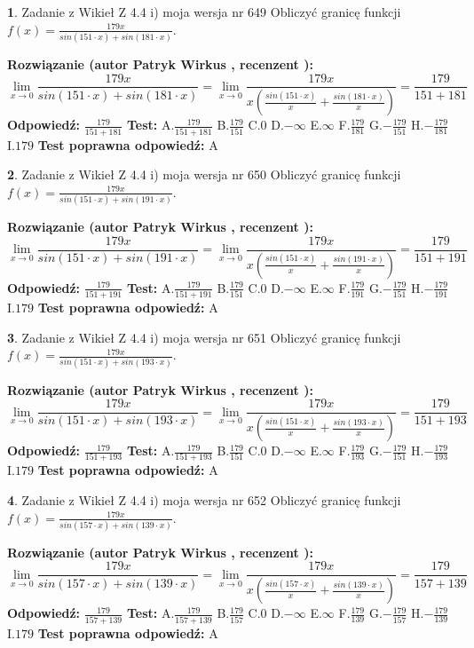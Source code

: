 \documentclass[12pt, a4paper]{article}
\theoremstyle{definition} %
\newtheorem{zad}{}
\newcommand{\zadStart}[1]{\begin{zad}#1\newline}
\newcommand{\zadStop}{\end{zad}}
\newcommand{\rozwStart}[2]{\noindent \textbf{Rozwiązanie (autor #1 , recenzent #2): }\newline}
\newcommand{\rozwStop}{\newline}
\newcommand{\odpStart}{\noindent \textbf{Odpowiedź:}\newline}
\newcommand{\odpStop}{\newline}
\newcommand{\testStart}{\noindent \textbf{Test:}\newline}
\newcommand{\testStop}{\newline}
\newcommand{\kluczStart}{\noindent \textbf{Test poprawna odpowiedź:}\newline}
\newcommand{\kluczStop}{\newline}
\begin{document}
\zadStart{Zadanie z Wikieł Z 4.4 i) moja wersja nr 649}
Obliczyć granicę funkcji $f(x)=\frac{179x}{sin(151\cdot x) +sin(181\cdot x)}$.
\zadStop
\rozwStart{Patryk Wirkus}{}
$$\lim\limits_{x\to 0}\frac{179x}{sin(151\cdot x) +sin(181\cdot x)}=\lim\limits_{x\to 0}\frac{179x}{x(\frac{sin(151\cdot x)}{x}+\frac{sin(181\cdot x)}{x})}=\frac{179}{151+181}$$
\rozwStop
\odpStart
$\frac{179}{151+181}$
\odpStop
\testStart
A.$\frac{179}{151+181}$
B.$\frac{179}{151}$
C.$0$
D.$-\infty$
E.$\infty$
F.$\frac{179}{181}$
G.$-\frac{179}{151}$
H.$-\frac{179}{181}$
I.$179$
\testStop
\kluczStart
A
\kluczStop



\zadStart{Zadanie z Wikieł Z 4.4 i) moja wersja nr 650}
Obliczyć granicę funkcji $f(x)=\frac{179x}{sin(151\cdot x) +sin(191\cdot x)}$.
\zadStop
\rozwStart{Patryk Wirkus}{}
$$\lim\limits_{x\to 0}\frac{179x}{sin(151\cdot x) +sin(191\cdot x)}=\lim\limits_{x\to 0}\frac{179x}{x(\frac{sin(151\cdot x)}{x}+\frac{sin(191\cdot x)}{x})}=\frac{179}{151+191}$$
\rozwStop
\odpStart
$\frac{179}{151+191}$
\odpStop
\testStart
A.$\frac{179}{151+191}$
B.$\frac{179}{151}$
C.$0$
D.$-\infty$
E.$\infty$
F.$\frac{179}{191}$
G.$-\frac{179}{151}$
H.$-\frac{179}{191}$
I.$179$
\testStop
\kluczStart
A
\kluczStop



\zadStart{Zadanie z Wikieł Z 4.4 i) moja wersja nr 651}
Obliczyć granicę funkcji $f(x)=\frac{179x}{sin(151\cdot x) +sin(193\cdot x)}$.
\zadStop
\rozwStart{Patryk Wirkus}{}
$$\lim\limits_{x\to 0}\frac{179x}{sin(151\cdot x) +sin(193\cdot x)}=\lim\limits_{x\to 0}\frac{179x}{x(\frac{sin(151\cdot x)}{x}+\frac{sin(193\cdot x)}{x})}=\frac{179}{151+193}$$
\rozwStop
\odpStart
$\frac{179}{151+193}$
\odpStop
\testStart
A.$\frac{179}{151+193}$
B.$\frac{179}{151}$
C.$0$
D.$-\infty$
E.$\infty$
F.$\frac{179}{193}$
G.$-\frac{179}{151}$
H.$-\frac{179}{193}$
I.$179$
\testStop
\kluczStart
A
\kluczStop



\zadStart{Zadanie z Wikieł Z 4.4 i) moja wersja nr 652}
Obliczyć granicę funkcji $f(x)=\frac{179x}{sin(157\cdot x) +sin(139\cdot x)}$.
\zadStop
\rozwStart{Patryk Wirkus}{}
$$\lim\limits_{x\to 0}\frac{179x}{sin(157\cdot x) +sin(139\cdot x)}=\lim\limits_{x\to 0}\frac{179x}{x(\frac{sin(157\cdot x)}{x}+\frac{sin(139\cdot x)}{x})}=\frac{179}{157+139}$$
\rozwStop
\odpStart
$\frac{179}{157+139}$
\odpStop
\testStart
A.$\frac{179}{157+139}$
B.$\frac{179}{157}$
C.$0$
D.$-\infty$
E.$\infty$
F.$\frac{179}{139}$
G.$-\frac{179}{157}$
H.$-\frac{179}{139}$
I.$179$
\testStop
\kluczStart
A
\kluczStop
\end{document}
